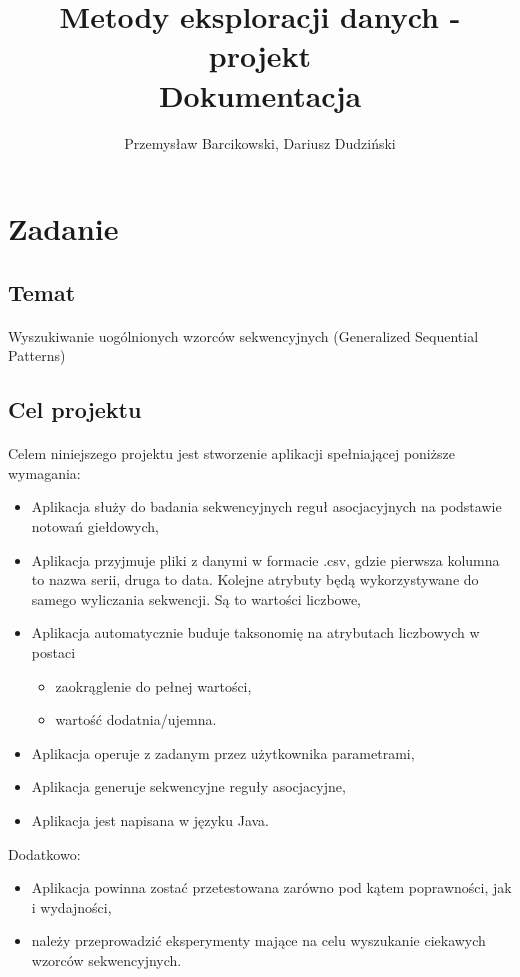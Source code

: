 \documentclass[11pt,a4paper]{article}
\title{ \textbf{Metody eksploracji danych - projekt} \\ \Large Dokumentacja}
\author{Przemysław Barcikowski, Dariusz Dudziński}
\begin{document}
\maketitle
\section{Zadanie}
\subsection{Temat}
\paragraph{} Wyszukiwanie uogólnionych wzorców sekwencyjnych (Generalized Sequential Patterns)
\subsection{Cel projektu}
\paragraph{} Celem niniejszego projektu jest stworzenie aplikacji spełniającej poniższe wymagania:
\begin{itemize}
\item Aplikacja służy do badania sekwencyjnych reguł asocjacyjnych na podstawie notowań giełdowych,
\item Aplikacja przyjmuje pliki z danymi w formacie .csv, gdzie pierwsza kolumna to nazwa serii, druga to data. Kolejne atrybuty będą wykorzystywane do samego wyliczania sekwencji. Są to wartości liczbowe,
\item Aplikacja automatycznie buduje taksonomię na atrybutach liczbowych w postaci
\begin{itemize}
\item zaokrąglenie do pełnej wartości,
\item wartość dodatnia/ujemna.
\end{itemize}
\item Aplikacja operuje z zadanym przez użytkownika parametrami,


\item Aplikacja generuje sekwencyjne reguły asocjacyjne,
\item Aplikacja jest napisana w języku Java.
\end{itemize}
Dodatkowo:
\begin{itemize}
\item Aplikacja powinna zostać przetestowana zarówno pod kątem poprawności, jak i wydajności,
\item należy przeprowadzić eksperymenty mające na celu wyszukanie ciekawych wzorców sekwencyjnych.
\end{itemize}
\end{document}
